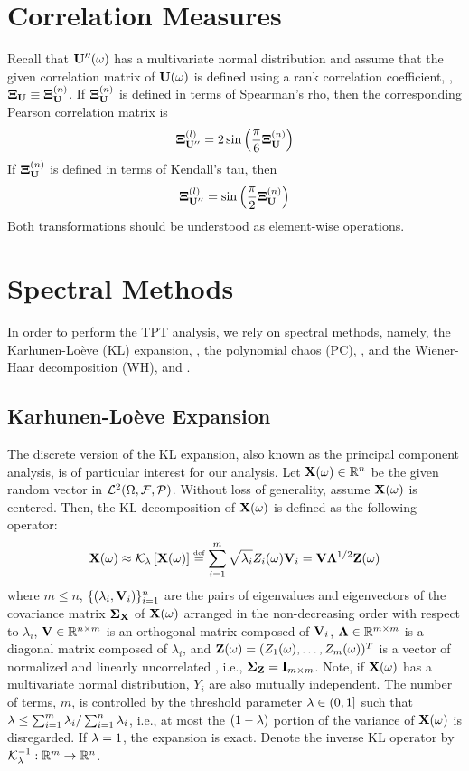 \renewcommand{\thesection}{S\arabic{section}}
\renewcommand{\thetable}{S\arabic{table}}
\renewcommand{\thefigure}{S\arabic{figure}}
\setcounter{table}{0}
\setcounter{figure}{0}

\section{Correlation Measures} 
Recall that $\mathbf{U}''(\omega)$ has a multivariate normal distribution and assume that the given correlation matrix of $\mathbf{U}(\omega)$ is defined using a rank correlation coefficient, \ie, $\mathbf{\Xi}_{\mathbf{U}} \equiv \mathbf{\Xi}^{(n)}_{\mathbf{U}}$. If $\mathbf{\Xi}^{(n)}_{\mathbf{U}}$ is defined in terms of Spearman's rho, then the corresponding Pearson correlation matrix is
\[
  \mathbf{\Xi}^{(l)}_{\mathbf{U}''} = 2 \sin \left( \frac{\pi}{6} \mathbf{\Xi}^{(n)}_{\mathbf{U}} \right)
\]
If $\mathbf{\Xi}^{(n)}_{\mathbf{U}}$ is defined in terms of Kendall's tau, then
\[
  \mathbf{\Xi}^{(l)}_{\mathbf{U}''} = \sin \left( \frac{\pi}{2} \mathbf{\Xi}^{(n)}_{\mathbf{U}} \right)
\]
Both transformations should be understood as element-wise operations.

\section{Spectral Methods} 
In order to perform the TPT analysis, we rely on spectral methods, namely, the Karhunen-Lo\`{e}ve (KL) expansion, , the polynomial chaos (PC), , and the Wiener-Haar decomposition (WH),  and .

\subsection{Karhunen-Lo\`{e}ve Expansion} 
The discrete version of the KL expansion, also known as the principal component analysis, is of particular interest for our analysis. Let $\mathbf{X}(\omega) \in \mathbb{R}^n$ be the given random vector in $\mathcal{L}^{2}(\Omega, \mathcal{F}, \mathcal{P})$. Without loss of generality, assume $\mathbf{X}(\omega)$ is centered. Then, the KL decomposition of $\mathbf{X}(\omega)$ is defined as the following operator:
\[
  \v{X}(\o) \approx \oKL{\v{X}(\o)} \eqdef \sum_{i = 1}^m \sqrt{\lambda_i} \Z_i(\o) \v{V}_i = \m{V} \m{\Lambda}^{1/2} \vZ(\o)
\]
where $m \leq n$, $\{ (\lambda_i, \mathbf{V}_i) \}_{i = 1}^n$ are the pairs of eigenvalues and eigenvectors of the covariance matrix $\mathbf{\Sigma}_{\mathbf{X}}$ of $\mathbf{X}(\omega)$ arranged in the non-decreasing order with respect to $\lambda_i$, $\mathbf{V} \in \mathbb{R}^{n \times m}$ is an orthogonal matrix composed of $\mathbf{V}_i$, $\mathbf{\Lambda} \in \mathbb{R}^{m \times m}$ is a diagonal matrix composed of $\lambda_i$, and $\mathbf{Z}(\omega) = (Z_1(\omega), \dots, Z_m(\omega))^T$ is a vector of normalized and linearly uncorrelated \rvs, i.e., $\mathbf{\Sigma}_{\mathbf{Z}} = \mathbf{I}_{m \times m}$. Note, if $\mathbf{X}(\omega)$ has a multivariate normal distribution, $Y_i$ are also mutually independent. The number of terms, $m$, is controlled by the threshold parameter $\lambda \in (0, 1]$ such that $\lambda \leq \sum_{i = 1}^m \lambda_i / \sum_{i = 1}^n \lambda_i$, i.e., at most the $(1 - \lambda)$ portion of the variance of $\mathbf{X}(\omega)$ is disregarded. If $\lambda = 1$, the expansion is exact. Denote the inverse KL operator by $\oInvKL: \real^m \to \real^n$.


